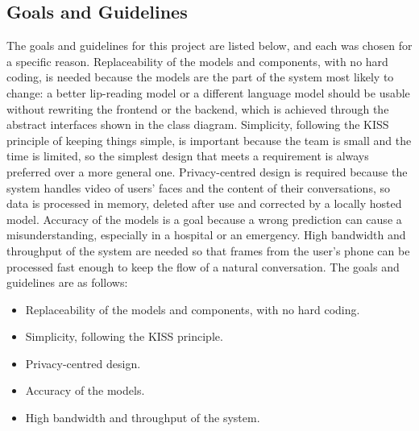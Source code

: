\documentclass{FastFyp}
\begin{document}
\subsection{Goals and Guidelines}
The goals and guidelines for this project are listed below, and each was chosen for a specific reason. Replaceability of the models and components, with no hard coding, is needed because the models are the part of the system most likely to change: a better lip-reading model or a different language model should be usable without rewriting the frontend or the backend, which is achieved through the abstract interfaces shown in the class diagram. Simplicity, following the KISS principle of keeping things simple, is important because the team is small and the time is limited, so the simplest design that meets a requirement is always preferred over a more general one. Privacy-centred design is required because the system handles video of users' faces and the content of their conversations, so data is processed in memory, deleted after use and corrected by a locally hosted model. Accuracy of the models is a goal because a wrong prediction can cause a misunderstanding, especially in a hospital or an emergency. High bandwidth and throughput of the system are needed so that frames from the user's phone can be processed fast enough to keep the flow of a natural conversation. The goals and guidelines are as follows:
\begin{itemize}
\item Replaceability of the models and components, with no hard coding.
\item Simplicity, following the KISS principle.
\item Privacy-centred design.
\item Accuracy of the models.
\item High bandwidth and throughput of the system.
\end{itemize}
\end{document}
